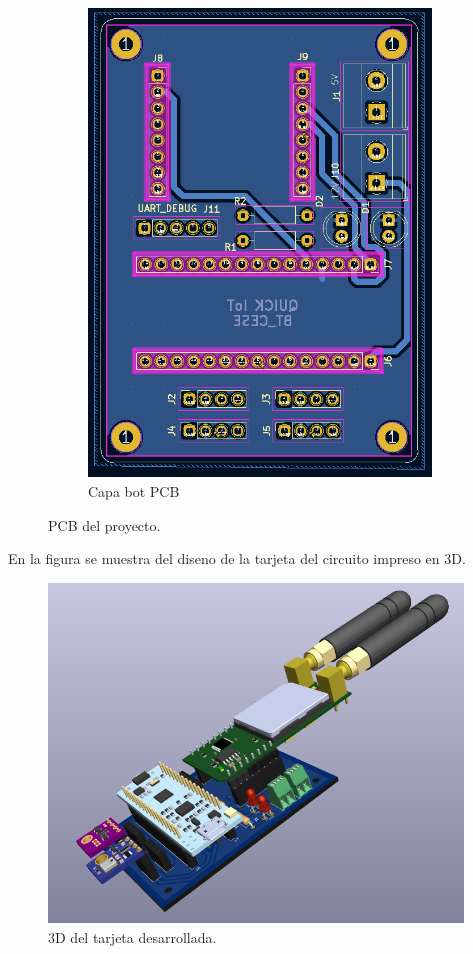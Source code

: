 \begin{figure}[h!]
\begin{subfigure}[b]{0.44\linewidth}
  \includegraphics[width=\linewidth]{./Figures/pcb_bot.png}
  \caption{Capa bot PCB}
  \label{fig:Capa bot PCB}
  \end{subfigure}
  \caption{PCB del proyecto.}
  \label{fig:PCB del proyecto}
  \end{figure}

En la figura se muestra del diseno de la tarjeta del circuito impreso en 3D.
\begin{figure}[h!]
  \centering
	\includegraphics[width=\textwidth, height=9cm]{./Figures/tarjeta3d.png}
  \caption{3D del tarjeta desarrollada.}
	\label{fig:3D del modulo}
\end{figure}


